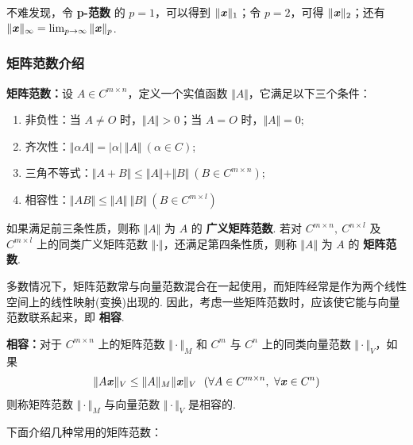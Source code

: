             \par 不难发现，令 \textbf{p-范数} 的 $p=1$，可以得到 $\Vert \textbf{\textit{x}} \Vert_1$；令 $p=2$，可得 $\Vert \textbf{\textit{x}} \Vert_2$；还有 $\Vert \textbf{\textit{x}} \Vert_{\infty} = \lim_{p\rightarrow\infty}\Vert \textbf{\textit{x}} \Vert_p$.
        \subsubsection{矩阵范数介绍}
            \par \textbf{矩阵范数：}设 $A \in C^{m\times n}$，定义一个实值函数 $\Vert A \Vert$，它满足以下三个条件：
            \begin{enumerate}
                \item 非负性：当 $A \ne O$ 时，$\Vert A \Vert > 0$；当 $A = O$ 时，$\Vert A \Vert = 0$;
                \item 齐次性：$\Vert \alpha A \Vert = |\alpha| \ \Vert A \Vert \ (\alpha \in C)$;
                \item 三角不等式：$\Vert A + B \Vert \leq \Vert A \Vert + \Vert B \Vert \ (B \in C^{m\times n})$;
                \item 相容性：$\Vert AB \Vert \leq \Vert A \Vert \ \Vert B \Vert \ (B \in C^{m \times l})$ 
            \end{enumerate}
            如果满足前三条性质，则称 $\Vert A \Vert$ 为 $A$ 的 \textbf{广义矩阵范数}. 若对 $C^{m \times n}, \ C^{n \times l}$ 及 $C^{m \times l}$ 上的同类广义矩阵范数 $\Vert \cdot \Vert$，还满足第四条性质，则称 $\Vert A \Vert$ 为 $A$ 的 \textbf{矩阵范数}.
            \\
            \par 多数情况下，矩阵范数常与向量范数混合在一起使用，而矩阵经常是作为两个线性空间上的线性映射(变换)出现的. 因此，考虑一些矩阵范数时，应该使它能与向量范数联系起来，即 \textbf{相容}.
            \par \textbf{相容：}对于 $C^{m \times n}$ 上的矩阵范数 $\Vert \cdot \Vert_M$ 和 $C^m$ 与 $C^n$ 上的同类向量范数 $\Vert \cdot \Vert_V$，如果 
            \begin{align*}
                \Vert A\textbf{\textit{x}} \Vert_V \leq \Vert A \Vert_M \Vert \textbf{\textit{x}} \Vert_V \ \ (\forall A \in C^{m \times n}, \ \forall \textbf{\textit{x}} \in C^n)
            \end{align*}
            则称矩阵范数 $\Vert \cdot \Vert_M$ 与向量范数 $\Vert \cdot \Vert_V$ 是相容的.
            \\
            \par 下面介绍几种常用的矩阵范数：
